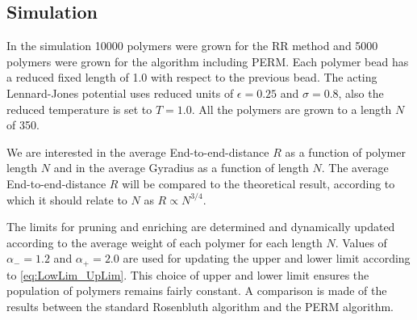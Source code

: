 \subsection*{Simulation}
In the simulation 10000 polymers were grown for the RR method and 5000 polymers were grown for the algorithm including PERM. Each polymer bead has a reduced fixed length of 1.0 with respect to the previous bead. The acting Lennard-Jones potential uses reduced units of $\epsilon=0.25$ and $\sigma=0.8$, also the reduced temperature is set to $T=1.0$. All the polymers are grown to a length $N$ of 350. 

We are interested in the average End-to-end-distance $R$ as a function of polymer length $N$ and in the average Gyradius as a function of length $N$. The average End-to-end-distance $R$ will be compared to the theoretical result, according to which it should relate to $N$ as $R\propto N^{3/4}$.

The limits for pruning and enriching are determined and dynamically updated according to the average weight of each polymer for each length $N$. Values of $\alpha_-=1.2$ and $\alpha_+=2.0$ are used for updating the upper and lower limit according to \eqref{eq:LowLim_UpLim}. This choice of upper and lower limit ensures the population of polymers remains fairly constant. A comparison is made of the results between the standard Rosenbluth algorithm and the PERM algorithm.